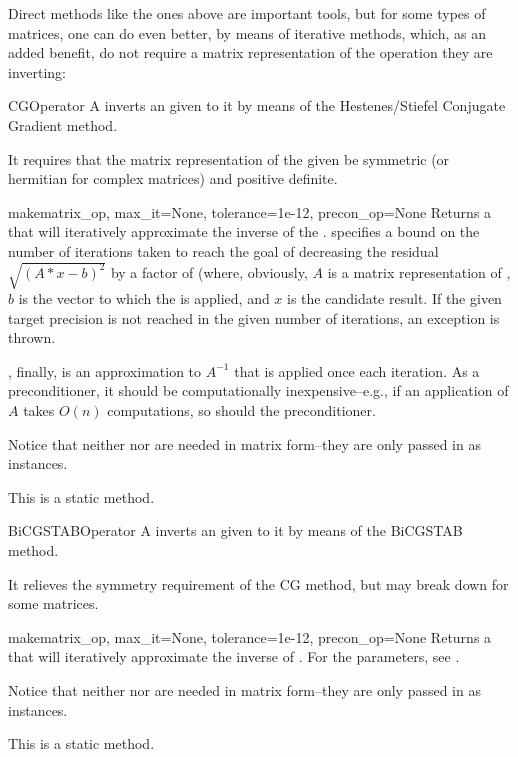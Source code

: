 Direct methods like the ones above are important tools, but for some
types of matrices, one can do even better, by means of iterative methods,
which, as an added benefit, do not require a matrix representation of
the operation they are inverting:
\begin{classdesc*}{CGOperator}
  A  inverts an  given to it
  by means of the Hestenes/Stiefel Conjugate Gradient method.

  It requires that the matrix representation of the given 
   be symmetric (or hermitian for complex matrices) 
  and positive definite.
\end{classdesc*}
\begin{methoddesc}{make}{matrix\_op, max\_it=None, tolerance=1e-12, precon\_op=None}
  Returns a  that will iteratively approximate the
  inverse of the  . 
  specifies a bound on the number of iterations taken to reach the
  goal of decreasing the residual $\sqrt{(A*x-b)^2}$ by a factor of
   (where, obviously, $A$ is a matrix representation of
  , $b$ is the vector to which the 
  is applied, and $x$ is the candidate result.  If the given target
  precision is not reached in the given number of iterations, an
  exception is thrown.

  , finally, is an approximation to $A^{-1}$ that is
  applied once each iteration. As a preconditioner, it should be
  computationally inexpensive--e.g., if an application of $A$ takes $O(n)$
  computations, so should the preconditioner.

  Notice that neither  nor  are needed
  in matrix form--they are only passed in as  instances.

  This is a static method.
\end{methoddesc}
\begin{classdesc*}{BiCGSTABOperator}
  A  inverts an  given to it
  by means of the BiCGSTAB method.

  It relieves the symmetry requirement of the CG method, but may break
  down for some matrices.
\end{classdesc*}
\begin{methoddesc}{make}{matrix\_op, max\_it=None, tolerance=1e-12, precon\_op=None}
  Returns a  that will iteratively approximate the
  inverse of . For the parameters, see .

  Notice that neither  nor  are needed
  in matrix form--they are only passed in as  instances.

  This is a static method.
\end{methoddesc}
